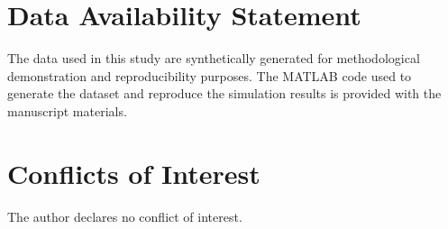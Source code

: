 \documentclass[11pt,a4paper]{article}
\begin{document}
\section*{Data Availability Statement}
The data used in this study are synthetically generated for methodological demonstration and reproducibility purposes. The MATLAB code used to generate the dataset and reproduce the simulation results is provided with the manuscript materials.

\section*{Conflicts of Interest}
The author declares no conflict of interest.



\end{document}

